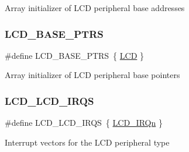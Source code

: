 Array initializer of L\+CD peripheral base addresses \mbox{\label{group___l_c_d___peripheral___access___layer_gaad12448c57d0c01fa9ae38cd9216eae8}} 
\subsubsection{\texorpdfstring{LCD\_BASE\_PTRS}{LCD\_BASE\_PTRS}}
{\footnotesize\ttfamily \#define L\+C\+D\+\_\+\+B\+A\+S\+E\+\_\+\+P\+T\+RS~\{ \mbox{\hyperlink{group___l_c_d___peripheral___access___layer_gabf2d80992dcfabfd1668184c3dff2733}{L\+CD}} \}}

Array initializer of L\+CD peripheral base pointers \mbox{\label{group___l_c_d___peripheral___access___layer_gace1f0d7f12c2d06d48148889f08f3bc1}} 
\subsubsection{\texorpdfstring{LCD\_LCD\_IRQS}{LCD\_LCD\_IRQS}}
{\footnotesize\ttfamily \#define L\+C\+D\+\_\+\+L\+C\+D\+\_\+\+I\+R\+QS~\{ \mbox{\hyperlink{group___interrupt__vector__numbers_gga666eb0caeb12ec0e281415592ae89083a161916b33cc34138d17e57eaa8464568}{L\+C\+D\+\_\+\+I\+R\+Qn}} \}}

Interrupt vectors for the L\+CD peripheral type 